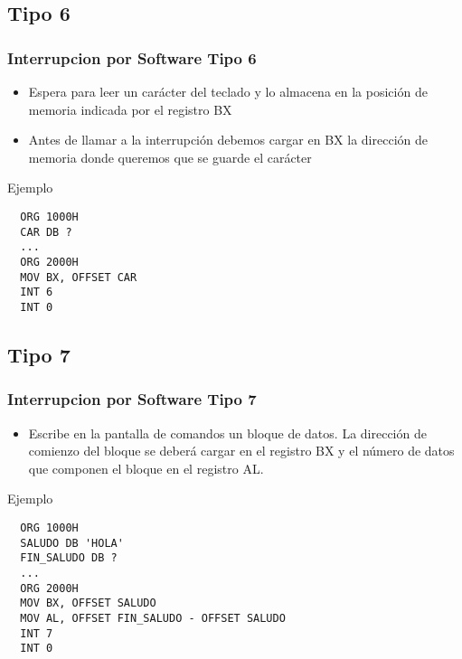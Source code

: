 \documentclass{beamer}
\begin{document}
\subsection{Tipo 6}
\begin{frame}[fragile]
\frametitle{Interrupcion por Software Tipo 6}
\begin{itemize}
 \item Espera para leer un carácter del teclado y lo almacena en la posición de memoria indicada por el registro BX
 \item Antes de llamar a la interrupción debemos cargar en BX la dirección de memoria donde queremos que se guarde el carácter
\end{itemize}

\begin{block}{Ejemplo}

\begin{verbatim}
  ORG 1000H
  CAR DB ?
  ...
  ORG 2000H
  MOV BX, OFFSET CAR
  INT 6
  INT 0

\end{verbatim}

\end{block}

\end{frame}

\subsection{Tipo 7}
\begin{frame}[fragile]
\frametitle{Interrupcion por Software Tipo 7}
\begin{itemize}
 \item Escribe en la pantalla de comandos un bloque de datos. La dirección de comienzo del bloque se deberá cargar en el registro BX y el número de datos que componen el bloque en el registro AL.
\end{itemize}
\begin{block}{Ejemplo}
\begin{verbatim}
  ORG 1000H
  SALUDO DB 'HOLA'
  FIN_SALUDO DB ?
  ...
  ORG 2000H
  MOV BX, OFFSET SALUDO
  MOV AL, OFFSET FIN_SALUDO - OFFSET SALUDO
  INT 7
  INT 0
\end{verbatim}
\end{block}

\end{frame}
\end{document}
